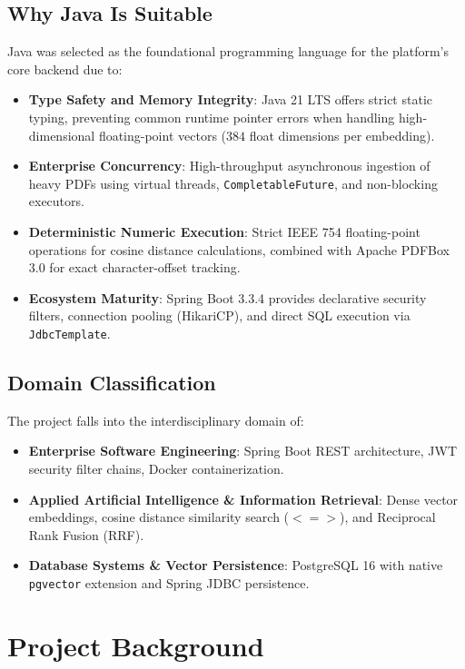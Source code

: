 \documentclass[11pt,a4paper,titlepage]{report}
\begin{document}
\section{Why Java Is Suitable}
Java was selected as the foundational programming language for the platform's core backend due to:
\begin{itemize}
    \item \textbf{Type Safety and Memory Integrity}: Java 21 LTS offers strict static typing, preventing common runtime pointer errors when handling high-dimensional floating-point vectors ($384$ float dimensions per embedding).
    \item \textbf{Enterprise Concurrency}: High-throughput asynchronous ingestion of heavy PDFs using virtual threads, \texttt{CompletableFuture}, and non-blocking executors.
    \item \textbf{Deterministic Numeric Execution}: Strict IEEE 754 floating-point operations for cosine distance calculations, combined with Apache PDFBox 3.0 for exact character-offset tracking.
    \item \textbf{Ecosystem Maturity}: Spring Boot 3.3.4 provides declarative security filters, connection pooling (HikariCP), and direct SQL execution via \texttt{JdbcTemplate}.
\end{itemize}

\section{Domain Classification}
The project falls into the interdisciplinary domain of:
\begin{itemize}
    \item \textbf{Enterprise Software Engineering}: Spring Boot REST architecture, JWT security filter chains, Docker containerization.
    \item \textbf{Applied Artificial Intelligence \& Information Retrieval}: Dense vector embeddings, cosine distance similarity search ($<=>$), and Reciprocal Rank Fusion (RRF).
    \item \textbf{Database Systems \& Vector Persistence}: PostgreSQL 16 with native \texttt{pgvector} extension and Spring JDBC persistence.
\end{itemize}

\chapter{Project Background}
\end{document}
